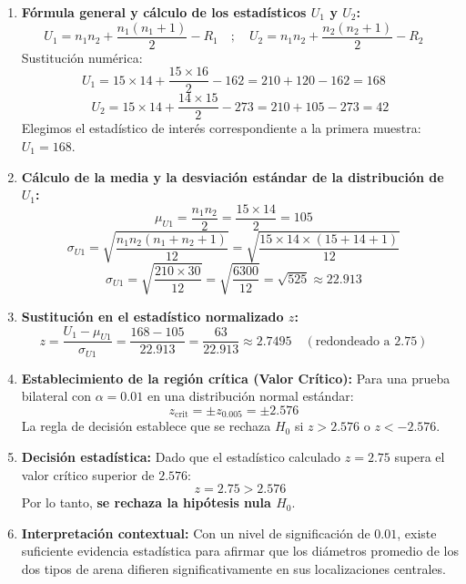 \documentclass[11pt,a4paper]{article}
\begin{document}
\begin{enumerate}
    \item \textbf{Fórmula general y cálculo de los estadísticos $U_1$ y $U_2$:}
    \[ U_1 = n_1 n_2 + \frac{n_1(n_1+1)}{2} - R_1 \quad ; \quad U_2 = n_1 n_2 + \frac{n_2(n_2+1)}{2} - R_2 \quad \]
    Sustitución numérica:
    \[ U_1 = 15 \times 14 + \frac{15 \times 16}{2} - 162 = 210 + 120 - 162 = 168 \quad \]
    \[ U_2 = 15 \times 14 + \frac{14 \times 15}{2} - 273 = 210 + 105 - 273 = 42 \]
    Elegimos el estadístico de interés correspondiente a la primera muestra: $U_1 = 168$.

    \item \textbf{Cálculo de la media y la desviación estándar de la distribución de $U_1$:}
    \[ \mu_{U1} = \frac{n_1 n_2}{2} = \frac{15 \times 14}{2} = 105 \quad \]
    \[ \sigma_{U1} = \sqrt{\frac{n_1 n_2 (n_1 + n_2 + 1)}{12}} = \sqrt{\frac{15 \times 14 \times (15 + 14 + 1)}{12}} \quad \]
    \[ \sigma_{U1} = \sqrt{\frac{210 \times 30}{12}} = \sqrt{\frac{6300}{12}} = \sqrt{525} \approx 22.913 \quad \]

    \item \textbf{Sustitución en el estadístico normalizado $z$:}
    \[ z = \frac{U_1 - \mu_{U1}}{\sigma_{U1}} = \frac{168 - 105}{22.913} = \frac{63}{22.913} \approx 2.7495 \quad (\text{redondeado a } 2.75) \quad \]

    \item \textbf{Establecimiento de la región crítica (Valor Crítico):}
    Para una prueba bilateral con $\alpha = 0.01$ en una distribución normal estándar:
    \[ z_{\text{crit}} = \pm z_{0.005} = \pm 2.576 \quad \]
    La regla de decisión establece que se rechaza $H_0$ si $z > 2.576$ o $z < -2.576$.

    \item \textbf{Decisión estadística:}
    Dado que el estadístico calculado $z = 2.75$ supera el valor crítico superior de $2.576$:
    \[ z = 2.75 > 2.576 \]
    Por lo tanto, \textbf{se rechaza la hipótesis nula $H_0$}.

    \item \textbf{Interpretación contextual:}
    Con un nivel de significación de $0.01$, existe suficiente evidencia estadística para afirmar que los diámetros promedio de los dos tipos de arena difieren significativamente en sus localizaciones centrales.

\end{enumerate}
\end{document}
